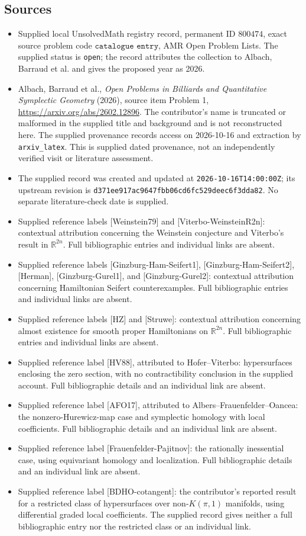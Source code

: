\documentclass[11pt]{article}
\newcommand{\R}{\mathbb{R}}
\begin{document}
\subsection{Sources}
\begin{itemize}
\item Supplied local UnsolvedMath registry record, permanent ID \(800474\), exact source problem code \(\texttt{catalogue entry}\), AMR Open Problem Lists. The supplied status is \texttt{open}; the record attributes the collection to Albach, Barraud et al. and gives the proposed year as 2026.
\item Albach, Barraud et al., \emph{Open Problems in Billiards and Quantitative Symplectic Geometry} (2026), source item Problem 1, \url{https://arxiv.org/abs/2602.12896}. The contributor's name is truncated or malformed in the supplied title and background and is not reconstructed here. The supplied provenance records access on 2026-10-16 and extraction by \texttt{arxiv\_latex}. This is supplied dated provenance, not an independently verified visit or literature assessment.
\item The supplied record was created and updated at \texttt{2026-10-16T14:00:00Z}; its upstream revision is \texttt{d371ee917ac9647fbb06cd6fc529deec6f3dda82}. No separate literature-check date is supplied.
\item Supplied reference labels [Weinstein79] and [Viterbo-WeinsteinR2n]: contextual attribution concerning the Weinstein conjecture and Viterbo's result in \(\R^{2n}\). Full bibliographic entries and individual links are absent.
\item Supplied reference labels [Ginzburg-Ham-Seifert1], [Ginzburg-Ham-Seifert2], [Herman], [Ginzburg-Gurel1], and [Ginzburg-Gurel2]: contextual attribution concerning Hamiltonian Seifert counterexamples. Full bibliographic entries and individual links are absent.
\item Supplied reference labels [HZ] and [Struwe]: contextual attribution concerning almost existence for smooth proper Hamiltonians on \(\R^{2n}\). Full bibliographic entries and individual links are absent.
\item Supplied reference label [HV88], attributed to Hofer--Viterbo: hypersurfaces enclosing the zero section, with no contractibility conclusion in the supplied account. Full bibliographic details and an individual link are absent.
\item Supplied reference label [AFO17], attributed to Albers--Frauenfelder--Oancea: the nonzero-Hurewicz-map case and symplectic homology with local coefficients. Full bibliographic details and an individual link are absent.
\item Supplied reference label [Frauenfelder-Pajitnov]: the rationally inessential case, using equivariant homology and localization. Full bibliographic details and an individual link are absent.
\item Supplied reference label [BDHO-cotangent]: the contributor's reported result for a restricted class of hypersurfaces over non-\(K(\pi,1)\) manifolds, using differential graded local coefficients. The supplied record gives neither a full bibliographic entry nor the restricted class or an individual link.
\end{itemize}
\end{document}
